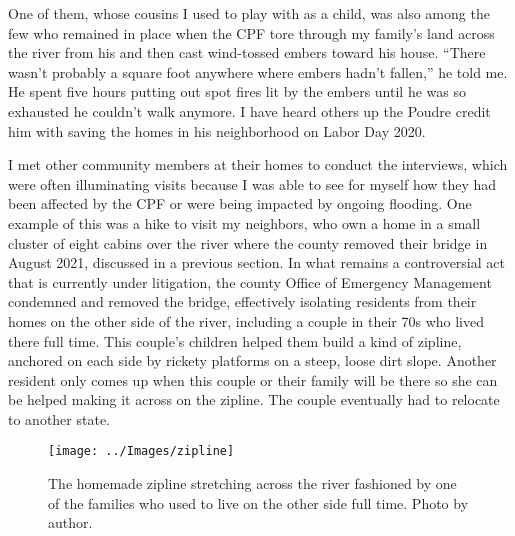 \documentclass[
]{article}
\begin{document}
One of them, whose cousins I used to play with as a child, was also among the few who remained in place when the CPF tore through my family's land across the river from his and then cast wind-tossed embers toward his house. ``There wasn't probably a square foot anywhere where embers hadn't fallen,'' he told me. He spent five hours putting out spot fires lit by the embers until he was so exhausted he couldn't walk anymore. I have heard others up the Poudre credit him with saving the homes in his neighborhood on Labor Day 2020.

I met other community members at their homes to conduct the interviews, which were often illuminating visits because I was able to see for myself how they had been affected by the CPF or were being impacted by ongoing flooding. One example of this was a hike to visit my neighbors, who own a home in a small cluster of eight cabins over the river where the county removed their bridge in August 2021, discussed in a previous section. In what remains a controversial act that is currently under litigation, the county Office of Emergency Management condemned and removed the bridge, effectively isolating residents from their homes on the other side of the river, including a couple in their 70s who lived there full time. This couple's children helped them build a kind of zipline, anchored on each side by rickety platforms on a steep, loose dirt slope. Another resident only comes up when this couple or their family will be there so she can be helped making it across on the zipline. The couple eventually had to relocate to another state.

\begin{figure}
\texttt{[image: ../Images/zipline]} \caption[Zipline]{The homemade zipline stretching across the river fashioned by one of the families who used to live on the other side full time. Photo by author.}\label{fig:figureTitle9}
\end{figure}
\end{document}
